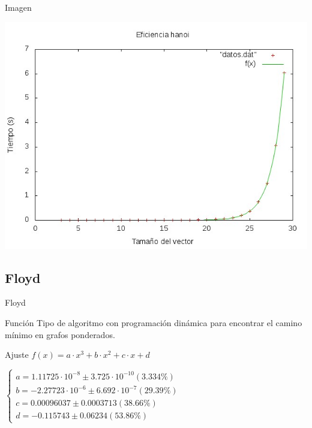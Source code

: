 \documentclass[compress]{beamer}
\begin{document}
\begin{frame}
	\begin{alertblock}{Imagen}
	\begin{center}
	\includegraphics[scale=0.55]{../Graficas/Hanoi/hanoiO0_ruben.jpeg}
	\end{center}
	\end{alertblock}
\end{frame}



\subsection{Floyd}
\begin{frame}{Floyd}
	\begin{block}{Función}
	Tipo de algoritmo con programación dinámica para encontrar el camino mínimo en grafos 		ponderados.
	\end{block}
	
	\begin{block}{Ajuste}
	$f(x) = a\cdot x^3 + b\cdot x^2 + c\cdot x + d $

	$\left\{ \begin{array}{c}
	a               = 1.11725\cdot 10^{-8}      \pm 3.725\cdot 10^{-10}    (3.334\%) \\
	b               = -2.27723\cdot 10^{-6}    \pm 6.692\cdot 10^{-7}    (29.39\%) \\
	c               = 0.00096037       \pm 0.0003713    (38.66\%) \\
	d               = -0.115743        \pm 0.06234      (53.86\%)
	\end{array}\right.$
	\end{block}
\end{frame}
\end{document}
